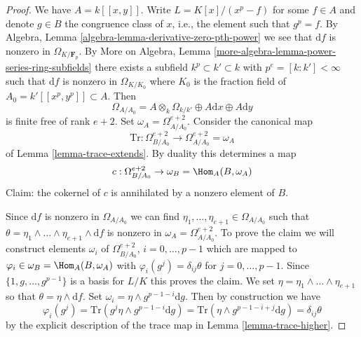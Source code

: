 \begin{proof}
We have $A = k[[x, y]]$. Write $L = K[x]/(x^p - f)$ for some $f \in A$
and denote $g \in B$ the congruence class of $x$, i.e., the element such
that $g^p = f$. By Algebra, Lemma \ref{algebra-lemma-derivative-zero-pth-power}
we see that $\text{d}f$ is nonzero in $\Omega_{K/\mathbf{F}_p}$. By
More on Algebra, Lemma \ref{more-algebra-lemma-power-series-ring-subfields}
there exists a subfield $k^p \subset k' \subset k$ with
$p^e = [k : k'] < \infty$ such that $\text{d}f$ is nonzero
in $\Omega_{K/K_0}$ where $K_0$ is the fraction field of
$A_0 = k'[[x^p, y^p]] \subset A$. Then
$$
\Omega_{A/A_0} =
A \otimes_k \Omega_{k/k'} \oplus A \text{d}x \oplus A \text{d}y
$$
is finite free of rank $e + 2$. Set $\omega_A = \Omega^{e + 2}_{A/A_0}$.
Consider the canonical map
$$
\text{Tr} :
\Omega^{e + 2}_{B/A_0}
\longrightarrow
\Omega^{e + 2}_{A/A_0} = \omega_A
$$
of Lemma \ref{lemma-trace-extends}. By duality this determines a map
$$
c : \Omega^{e + 2}_{B/A_0} \to \omega_B = \Hom_A(B, \omega_A)
$$
Claim: the cokernel of $c$ is annihilated by a nonzero element of $B$.

\medskip\noindent
Since $\text{d}f$ is nonzero in $\Omega_{A/A_0}$ we can find
$\eta_1, \ldots, \eta_{e + 1} \in \Omega_{A/A_0}$ such that
$\theta = \eta_1 \wedge \ldots \wedge \eta_{e + 1} \wedge \text{d}f$ is
nonzero in $\omega_A = \Omega^{e + 2}_{A/A_0}$. To prove the claim we
will construct elements $\omega_i$ of $\Omega^{e + 2}_{B/A_0}$,
$i = 0, \ldots, p - 1$ which are mapped to
$\varphi_i \in \omega_B = \Hom_A(B, \omega_A)$
with $\varphi_i(g^j) = \delta_{ij}\theta$ for $j = 0, \ldots, p - 1$.
Since $\{1, g, \ldots, g^{p - 1}\}$ is a basis for $L/K$ this
proves the claim. We set
$\eta = \eta_1 \wedge \ldots \wedge \eta_{e + 1}$
so that $\theta = \eta \wedge \text{d}f$.
Set $\omega_i = \eta \wedge g^{p - 1 - i}\text{d}g$. Then
by construction we have
$$
\varphi_i(g^j) = \text{Tr}(g^j \eta \wedge g^{p - 1 - i}\text{d}g) =
\text{Tr}(\eta \wedge g^{p - 1 - i + j}\text{d}g) = \delta_{ij} \theta
$$
by the explicit description of the trace map in Lemma \ref{lemma-trace-higher}.


\end{proof}
